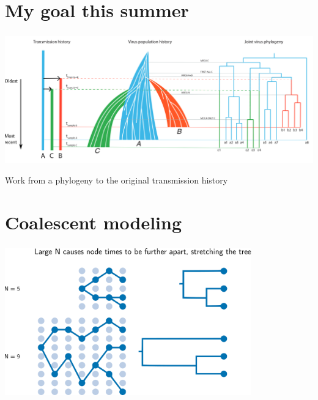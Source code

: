\documentclass[aspectratio=169]{beamer}
\begin{document}
\section{My goal this summer}

\begin{frame} \frametitle{\insertsection}
    \begin{center}
        \centering\includegraphics[width=\textwidth]{images/thomas-figure}

        Work from a phylogeny to the original transmission history

    \end{center}
\end{frame}

\section{Coalescent modeling}

\begin{frame} \frametitle{\insertsection}

        \centering\includegraphics[width=0.8\textwidth]{images/coalescence}

\end{frame}
\end{document}
